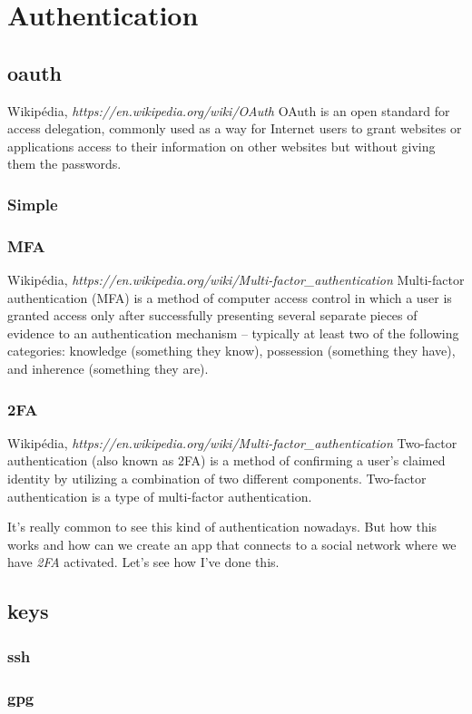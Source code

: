 \chapter{Authentication}
\section{oauth}
\begin{chapquote}{Wikipédia, \textit{https://en.wikipedia.org/wiki/OAuth}}
OAuth is an open standard for access delegation, commonly used as a way for Internet users to grant websites or applications access to their information on other websites but without giving them the passwords.
\end{chapquote}
\subsection{Simple}
\subsection{MFA}
\begin{chapquote}{Wikipédia, \textit{https://en.wikipedia.org/wiki/Multi-factor\_authentication}}
Multi-factor authentication (MFA) is a method of computer access control in which a user is granted access only after successfully presenting several separate pieces of evidence to an authentication mechanism – typically at least two of the following categories: knowledge (something they know), possession (something they have), and inherence (something they are).
\end{chapquote}
\subsection{2FA}
\begin{chapquote}{Wikipédia, \textit{https://en.wikipedia.org/wiki/Multi-factor\_authentication}}
Two-factor authentication (also known as 2FA) is a method of confirming a user's claimed identity by utilizing a combination of two different components. Two-factor authentication is a type of multi-factor authentication.
\end{chapquote}
It's really common to see this kind of authentication nowadays. But how this works and how can we create an app that connects to a social network where we have \textit{2FA} activated. Let's see how I've done this.\newline

\section{keys}
\subsection{ssh}
\subsection{gpg}
